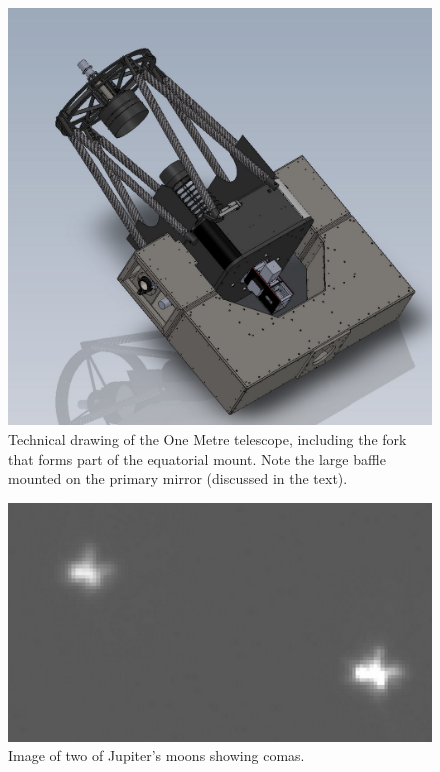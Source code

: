 \documentclass[a4paper,fleqn,usenatbib]{mnras}
\begin{document}
\begin{figure}
	\includegraphics[width=\columnwidth]{images/telescope.png}
    \caption{Technical drawing of the One Metre telescope, including the fork that forms part of the equatorial mount.  Note the large baffle mounted on the primary mirror (discussed in the text).}
    \label{fig:telescope}
\end{figure}

\begin{figure}
	\includegraphics[width=\columnwidth]{images/comas.png}
    \caption{Image of two of Jupiter's moons showing comas.}
    \label{fig:coma}
\end{figure}
\end{document}
